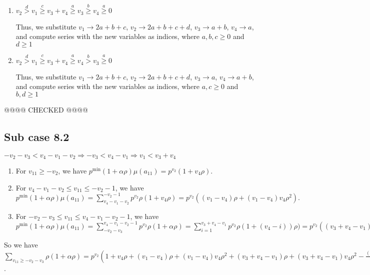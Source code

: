 \documentclass{article}
\begin{document}
\begin{enumerate}
Thus, we substitute 
$v_1\rightarrow{2a+b+c+d}$, 
$v_2\rightarrow{2a+b+c}$, 
$v_3\rightarrow{a+b}$, 
$v_4\rightarrow{a}$, and compute series with the new variables as indices, where $a,b,d\geq{0}$ and $c\geq{1}$
\item 
$v_2\overset{d}>v_1\overset{c}{\geq}v_3+v_4\overset{a}{\geq}{v_3}\overset{b}\geq{v_4}\overset{a}{\geq}{0}$

Thus, we substitute 
$v_1\rightarrow{2a+b+c}$, 
$v_2\rightarrow{2a+b+c+d}$, 
$v_3\rightarrow{a+b}$, 
$v_4\rightarrow{a}$, and compute series with the new variables as indices, where $a,b,c\geq{0}$ and $d\geq{1}$
\item 
$v_2\overset{d}>v_1\overset{c}{\geq}v_3+v_4\overset{a}{\geq}{v_4}\overset{b}>{v_3}\overset{a}{\geq}{0}$

Thus, we substitute 
$v_1\rightarrow{2a+b+c}$, 
$v_2\rightarrow{2a+b+c+d}$, 
$v_3\rightarrow{a}$, 
$v_4\rightarrow{a+b}$, and compute series with the new variables as indices, where $a,c\geq{0}$ and $b,d\geq{1}$
\end{enumerate}
@@@@ CHECKED @@@@
\subsection{Sub case 8.2}

$-v_2-v_3<{v_4-v_1-v_2}\Rightarrow{-v_3<{v_4-v_1}}\Rightarrow{v_1<{v_3+v_4}}$
\begin{enumerate}
    \item 
For $v_{11}\geq{-v_2}$, we have $p^{\min}(1+\alpha\rho)\mu(a_{11})=p^{v_2}(1+v_4\rho).$
\item 
For $v_4-v_1-v_2\leq{v_{11}}\leq{-v_2-1}$, we have $p^{\min}(1+\alpha\rho)\mu(a_{11})=\sum_{v_4-v_1-v_2}^{-v_2-1}p^{v_2}\rho(1+v_4\rho)=p^{v_2}((v_1-v_4)\rho+(v_1-v_4)v_4\rho^2).$
\item 
For $-v_2-v_3\leq{v_{11}}\leq{v_4-v_1-v_2-1}$, we have $p^{\min}(1+\alpha\rho)\mu(a_{11})=\sum_{-v_2-v_3}^{v_4-v_1-v_2-1}p^{v_2}\rho(1+\alpha\rho)=\sum_{i=1}^{v_3+v_4-v_1}p^{v_2}\rho(1+(v_4-i))\rho)=p^{v_2}((v_3+v_4-v_1)\rho+(v_3+v_4-v_1)v_4\rho^2-\binom{v_3+v_4-v_1+1}{2}\rho^2).$
\end{enumerate}
So we have $\sum_{v_{11}\geq{-v_2-v_3}}\rho(1+\alpha\rho)=p^{v_2}(
1+v_4\rho+(v_1-v_4)\rho+(v_1-v_4)v_4\rho^2+
(v_3+v_4-v_1)\rho+(v_3+v_4-v_1)v_4\rho^2-\frac{(v_3+v_4-v_1+1)(v_3+v_4-v_1)}{2}\rho^2)=p^{v_2}(1+v_3\rho+v_4\rho-\frac{v_3^2}{2}\rho^2+v_1v_3\rho^2-\frac{v_4^2}{2}\rho^2+v_1v_4\rho^2-\frac{v_1^2}{2}\rho^2-v_3\rho^2-v_4\rho^2+v_1\rho^2)$.
\end{document}
